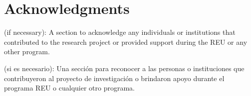 \section{Acknowledgments}
 (if necessary): A section to acknowledge any individuals or institutions that contributed to the research project or provided support during the REU or any other program.

(si es necesario): Una sección para reconocer a las personas o instituciones que contribuyeron al proyecto de investigación o brindaron apoyo durante el programa REU o cualquier otro programa. 

